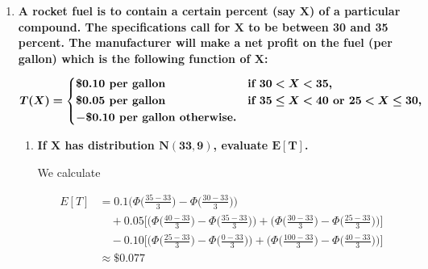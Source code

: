 \documentclass[10pt, oneside]{article}   	%
\theoremstyle{definition}
\begin{document}
\begin{enumerate}[label=9.\arabic*]
\begin{enumerate}
\begin{proof}
	\begin{align*}
	VZ &= (X_1 \cos (\omega t) + X_2 \sin (\omega t))(-X_1 \omega \sin (\omega t) + X_2 \omega \cos (\omega t)) \\
	&= X_1 X_2 \omega \cos^2 (\omega t) - X^2_1 \omega \sin (\omega t) \cos (\omega t) +  X^2_2 \omega \sin (\omega t) \cos (\omega t) - X_1 X_2 \omega \sin^2 (\omega t) \\
	E[VZ] &= \mu^2 \omega (\cos^2 (\omega t) - \sin^2 (\omega t))
	\end{align*}
	
	Therefore, $E[VZ] - E[V] E[Z] = 0$, implying $\boxed{ \rho = 0 }$ and that $Z(t), V(t)$ are uncorrelated.
	\end{proof}
	\end{enumerate}

\item  \begin{tcolorbox}[
  colback=Cerulean!5!white,
  colframe=Cerulean!75!black]
\textbf{A rocket fuel is to contain a certain percent (say $\bm{X}$) of a particular compound. The specifications call for $\bm{X}$ to be between 30 and 35 percent. The manufacturer will make a net profit on the fuel (per gallon) which is the following function of $\bm{X}$:}

\[ \bm{T(X) = }
\begin{dcases} 
\bm{\$ 0.10} \textbf{ per gallon} & \textbf{if } \bm{30 < X < 35,} \\
\bm{\$ 0.05} \textbf{ per gallon} & \textbf{if } \bm{35 \leq X < 40} \textbf{ or } \bm{25 < X \leq 30,} \\
\bm{-\$ 0.10} \textbf{ per gallon otherwise.}
\end{dcases}
\]
\end{tcolorbox}

	\begin{enumerate}
	\item  \begin{tcolorbox}[
	  colback=Cerulean!5!white,
	  colframe=Cerulean!75!black]
	\textbf{If $\bm{X}$ has distribution $\bm{N(33,9)}$, evaluate $\bm{E[T]}$.}
	\end{tcolorbox}
	
	We calculate
	
	\begin{align*}
	E[T] &= 0.1 \bigg( \Phi \bigg( \frac{35-33}{3} \bigg) - \Phi \bigg( \frac{30-33}{3} \bigg) \bigg) \\
	&\quad + 0.05 \bigg[ \bigg( \Phi \bigg( \frac{40-33}{3} \bigg) - \Phi \bigg( \frac{35-33}{3} \bigg) \bigg) + \bigg( \Phi \bigg( \frac{30-33}{3} \bigg) - \Phi \bigg( \frac{25-33}{3} \bigg) \bigg) \bigg] \\
	&\quad -0.10 \bigg[ \bigg( \Phi \bigg( \frac{25-33}{3} \bigg) - \Phi \bigg( \frac{0-33}{3} \bigg) \bigg) + \bigg( \Phi \bigg( \frac{100-33}{3} \bigg) - \Phi \bigg( \frac{40-33}{3} \bigg) \bigg) \bigg] \\
	&\approx \boxed{\$ 0.077}
	\end{align*}
	

\end{enumerate}
\end{enumerate}
\end{document}
